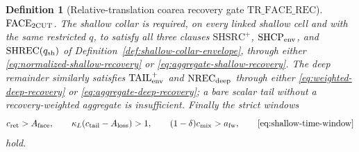 \documentclass[11pt]{article}
\newtheorem{definition}[theorem]{Definition}
\begin{document}
\begin{definition}[Relative-translation coarea recovery gate
$\mathrm{TR\_FACE\_REC}$]
$\mathrm{FACE}_{\rm 2CUT}$.  The
shallow collar is required, on every linked shallow cell and with the same
restricted $q$, to satisfy all three clauses
$\mathrm{SHSRC}^{+}$, $\mathrm{SHCP}_{\rm env}$, and
$\mathrm{SHREC}(q_{\rm sh})$ of
Definition~\ref{def:shallow-collar-envelope}, through either
\eqref{eq:normalized-shallow-recovery} or
\eqref{eq:aggregate-shallow-recovery}.  The deep remainder similarly
satisfies $\mathrm{TAIL}_{\rm env}^{+}$ and
$\mathrm{NREC}_{\rm deep}$ through either
\eqref{eq:weighted-deep-recovery} or
\eqref{eq:aggregate-deep-recovery}; a bare scalar tail without a
recovery-weighted aggregate is insufficient.  Finally the strict windows
\begin{equation}
\label{eq:translation-recovery-windows}
 c_{\rm ret}>A_{\rm face},\qquad
 \kappa_L(c_{\rm tail}-A_{\rm loss})>1,
 \qquad (1-\delta)c_{\rm mix}>a_{\rm fw},
 \qquad \eqref{eq:shallow-time-window}
\end{equation}
hold.
\end{definition}
\end{document}
